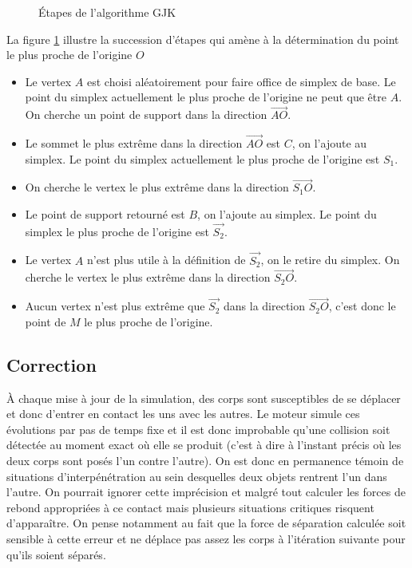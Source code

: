 \begin{figure}
  \centering

  \subfloat[]{  }
  \subfloat[]{  }
  \qquad
  \subfloat[]{  }
  \subfloat[]{  }
  \qquad
  \subfloat[]{  }
  \subfloat[]{  }

  \caption{{\'E}tapes de l'algorithme GJK}
  \label{gjk}
\end{figure}

La figure \ref{gjk} illustre la succession d'étapes qui amène à la
détermination du point le plus proche de l'origine $O$

\begin{itemize}
\item Le vertex $A$ est choisi aléatoirement pour faire office de
  simplex de base. Le point du simplex actuellement le plus proche de
  l'origine ne peut que être $A$. On cherche un point de support dans
  la direction $\vec{AO}$.
\item Le sommet le plus extrême dans la direction $\vec{AO}$ est $C$,
  on l'ajoute au simplex. Le point du simplex actuellement le plus
  proche de l'origine est $S_1$.
\item On cherche le vertex le plus extrême dans la direction
  $\vec{S_1O}$.
\item Le point de support retourné est $B$, on l'ajoute au simplex. Le
  point du simplex le plus proche de l'origine est $\vec{S_2}$.
\item Le vertex $A$ n'est plus utile à la définition de $\vec{S_2}$,
  on le retire du simplex. On cherche le vertex le plus extrême dans
  la direction $\vec{S_2O}$.
\item Aucun vertex n'est plus extrême que $\vec{S_2}$ dans la
  direction $\vec{S_2O}$, c'est donc le point de $M$ le plus proche de
  l'origine.
\end{itemize}

\subsection{Correction}

\`A chaque mise à jour de la simulation, des corps sont susceptibles
de se déplacer et donc d'entrer en contact les uns avec les autres. Le
moteur simule ces évolutions par pas de temps fixe et il est donc
improbable qu'une collision soit détectée au moment exact o\`u elle se
produit (c'est à dire à l'instant précis o\`u les deux corps sont
posés l'un contre l'autre). On est donc en permanence témoin de
situations d'interpénétration au sein desquelles deux objets rentrent
l'un dans l'autre.  On pourrait ignorer cette imprécision et malgré
tout calculer les forces de rebond appropriées à ce contact mais
plusieurs situations critiques risquent d'apparaître. On pense
notamment au fait que la force de séparation calculée soit sensible à
cette erreur et ne déplace pas assez les corps à l'itération suivante
pour qu'ils soient séparés.

